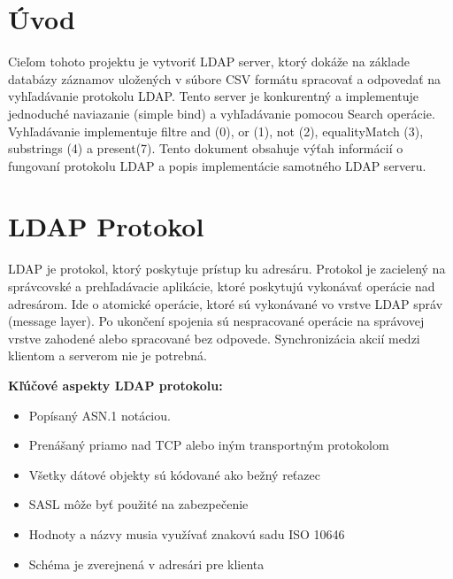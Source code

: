 \documentclass[11pt,a4paper]{article}
\begin{document}
\section{Úvod}
Cieľom tohoto projektu je vytvoriť LDAP server, ktorý dokáže na základe databázy záznamov uložených v súbore CSV formátu spracovať a odpovedať na vyhľadávanie protokolu LDAP. Tento server je konkurentný a implementuje jednoduché naviazanie (simple bind) a vyhľadávanie pomocou Search operácie. Vyhľadávanie implementuje filtre and (0), or (1), not (2), equalityMatch (3), substrings (4) a present(7). Tento dokument obsahuje výťah informácií o fungovaní protokolu LDAP a popis implementácie samotného LDAP serveru. 

\section{LDAP Protokol}
\cite{rfc2251}LDAP je protokol, ktorý poskytuje prístup ku adresáru. Protokol je zacielený na správcovské a prehľadávacie aplikácie, ktoré poskytujú vykonávať operácie nad adresárom. Ide o atomické operácie, ktoré sú vykonávané vo vrstve LDAP správ (message layer). Po ukončení spojenia sú nespracované operácie na správovej vrstve zahodené alebo spracované bez odpovede. Synchronizácia akcií medzi klientom a serverom nie je potrebná.
\linebreak

\noindent\textbf{Kľúčové aspekty LDAP protokolu:}
\begin{itemize}
	\item Popísaný ASN.1 notáciou.
	\item Prenášaný priamo nad TCP alebo iným transportným protokolom
	\item Všetky dátové objekty sú kódované ako bežný reťazec
	\item SASL môže byť použité na zabezpečenie
	\item Hodnoty a názvy musia využívať znakovú sadu ISO 10646
	\item Schéma je zverejnená v adresári pre klienta
\end{itemize}
\end{document}
